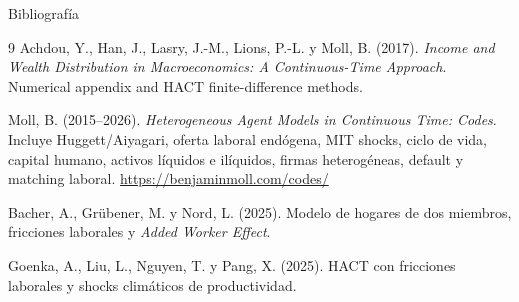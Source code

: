 \documentclass[aspectratio=169,11pt]{beamer}
\begin{document}
\begin{frame}[allowframebreaks]{Bibliograf\'ia}
  \footnotesize
  \begin{thebibliography}{9}
    Achdou, Y., Han, J., Lasry, J.-M., Lions, P.-L. y Moll, B. (2017).
    \newblock \emph{Income and Wealth Distribution in Macroeconomics: A Continuous-Time Approach}.
    \newblock Numerical appendix and HACT finite-difference methods.

    Moll, B. (2015--2026).
    \newblock \emph{Heterogeneous Agent Models in Continuous Time: Codes}.
    \newblock Incluye Huggett/Aiyagari, oferta laboral end\'ogena, MIT shocks, ciclo de vida, capital humano, activos l\'iquidos e il\'iquidos, firmas heterog\'eneas, default y matching laboral.
    \newblock \url{https://benjaminmoll.com/codes/}

    Bacher, A., Gr\"ubener, M. y Nord, L. (2025).
    \newblock Modelo de hogares de dos miembros, fricciones laborales y \emph{Added Worker Effect}.

    Goenka, A., Liu, L., Nguyen, T. y Pang, X. (2025).
    \newblock HACT con fricciones laborales y shocks clim\'aticos de productividad.
  \end{thebibliography}
\end{frame}
\end{document}
